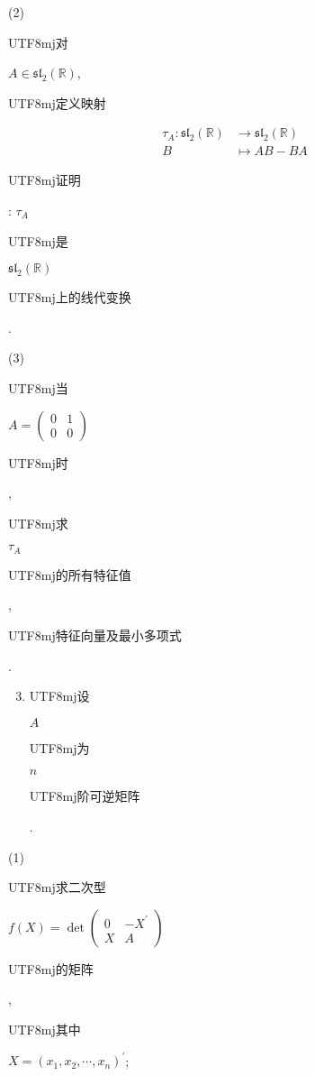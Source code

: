 \documentclass[10pt]{article}
\begin{document}
(2) \begin{CJK}{UTF8}{mj}对\end{CJK} $A \in \mathfrak{s l}_{2}(\mathbb{R})$, \begin{CJK}{UTF8}{mj}定义映射\end{CJK}
$$
\begin{aligned}
\tau_{A}: \mathfrak{s l}_{2}(\mathbb{R}) & \rightarrow \mathfrak{s l}_{2}(\mathbb{R}) \\
B & \mapsto A B-B A
\end{aligned}
$$
\begin{CJK}{UTF8}{mj}证明\end{CJK}: $\tau_{A}$ \begin{CJK}{UTF8}{mj}是\end{CJK} $\mathfrak{s l}_{2}(\mathbb{R})$ \begin{CJK}{UTF8}{mj}上的线代变换\end{CJK}.

(3) \begin{CJK}{UTF8}{mj}当\end{CJK} $A=\left(\begin{array}{ll}0 & 1 \\ 0 & 0\end{array}\right)$ \begin{CJK}{UTF8}{mj}时\end{CJK}, \begin{CJK}{UTF8}{mj}求\end{CJK} $\tau_{A}$ \begin{CJK}{UTF8}{mj}的所有特征值\end{CJK}, \begin{CJK}{UTF8}{mj}特征向量及最小多项式\end{CJK}.

\begin{enumerate}
  \setcounter{enumi}{2}
  \item \begin{CJK}{UTF8}{mj}设\end{CJK} $A$ \begin{CJK}{UTF8}{mj}为\end{CJK} $n$ \begin{CJK}{UTF8}{mj}阶可逆矩阵\end{CJK}.
\end{enumerate}
(1) \begin{CJK}{UTF8}{mj}求二次型\end{CJK} $f(X)=\operatorname{det}\left(\begin{array}{cc}0 & -X^{\prime} \\ X & A\end{array}\right)$ \begin{CJK}{UTF8}{mj}的矩阵\end{CJK}, \begin{CJK}{UTF8}{mj}其中\end{CJK} $X=\left(x_{1}, x_{2}, \cdots, x_{n}\right)^{\prime}$;
\end{document}
